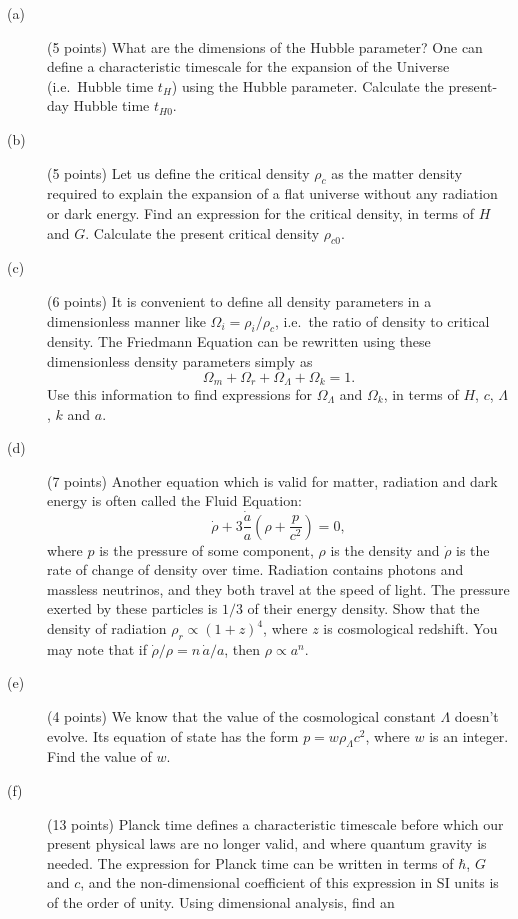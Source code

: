 \begin{description}
\item[(a)] (5 points) What are the dimensions of the Hubble parameter? One can
  define a characteristic timescale for the expansion of the Universe (i.e.\
  Hubble time $t_H$) using the Hubble parameter. Calculate the present-day
  Hubble time $t_{H0}$.
\item[(b)] (5 points) Let us define the critical density $\rho_c$ as the
  matter density required to explain the expansion of a flat universe without
  any radiation or dark energy. Find an expression for the critical density,
  in terms of $H$ and $G$. Calculate the present critical density
  $\rho_{c0}$.
\item[(c)] (6 points) It is convenient to define all density parameters in a
  dimensionless manner like $\Omega_i = \rho_i/\rho_c$, i.e.\ the ratio of
  density to critical density. The Friedmann Equation can be rewritten using
  these dimensionless density parameters simply as
  \[ \Omega_m + \Omega_r + \Omega_\Lambda + \Omega_k = 1. \]
  Use this information to find expressions for $\Omega_\Lambda$ and
  $\Omega_k$, in terms of $H$, $c$, $\Lambda$, $k$ and $a$.
\item[(d)] (7 points) Another equation which is valid for matter, radiation
  and dark energy is often called the Fluid Equation:
  \[ \dot{\rho} + 3\frac{\dot{a}}{a}\left(\rho + \frac{p}{c^2}\right) = 0, \]
  where $p$ is the pressure of some component, $\rho$ is the density and
  $\dot{\rho}$ is the rate of change of density over time. Radiation contains
  photons and massless neutrinos, and they both travel at the speed of light.
  The pressure exerted by these particles is $1/3$ of their energy density.
  Show that the density of radiation $\rho_r \propto (1+z)^4$, where $z$ is
  cosmological redshift. You may note that if
  $\dot{\rho}/\rho = n\,\dot{a}/a$, then $\rho \propto a^n$.
\item[(e)] (4 points) We know that the value of the cosmological constant
  $\Lambda$ doesn't evolve. Its equation of state has the form
  $p = w\rho_\Lambda c^2$, where $w$ is an integer. Find the value of $w$.
\item[(f)] (13 points) Planck time defines a characteristic timescale before
  which our present physical laws are no longer valid, and where quantum
  gravity is needed. The expression for Planck time can be written in terms of
  $\hbar$, $G$ and $c$, and the non-dimensional coefficient of this expression
  in SI units is of the order of unity. Using dimensional analysis, find an

\end{description}

